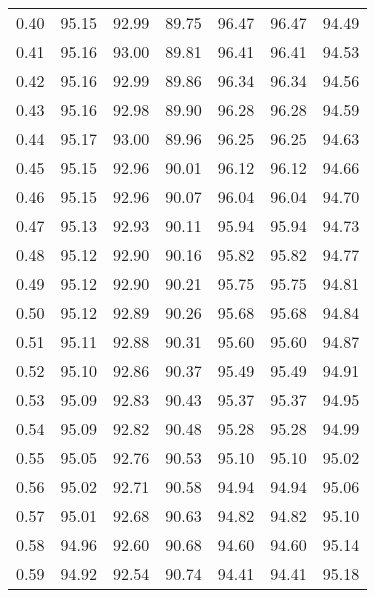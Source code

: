 \begin{tabular}{|c|c|c|c|c|c|c|}
      0.40 &     95.15 &     92.99 &      89.75 &   96.47 &      96.47 &         94.49 \\
      0.41 &     95.16 &     93.00 &      89.81 &   96.41 &      96.41 &         94.53 \\
      0.42 &     95.16 &     92.99 &      89.86 &   96.34 &      96.34 &         94.56 \\
      0.43 &     95.16 &     92.98 &      89.90 &   96.28 &      96.28 &         94.59 \\
      0.44 &     95.17 &     93.00 &      89.96 &   96.25 &      96.25 &         94.63 \\
      0.45 &     95.15 &     92.96 &      90.01 &   96.12 &      96.12 &         94.66 \\
      0.46 &     95.15 &     92.96 &      90.07 &   96.04 &      96.04 &         94.70 \\
      0.47 &     95.13 &     92.93 &      90.11 &   95.94 &      95.94 &         94.73 \\
      0.48 &     95.12 &     92.90 &      90.16 &   95.82 &      95.82 &         94.77 \\
      0.49 &     95.12 &     92.90 &      90.21 &   95.75 &      95.75 &         94.81 \\
      0.50 &     95.12 &     92.89 &      90.26 &   95.68 &      95.68 &         94.84 \\
      0.51 &     95.11 &     92.88 &      90.31 &   95.60 &      95.60 &         94.87 \\
      0.52 &     95.10 &     92.86 &      90.37 &   95.49 &      95.49 &         94.91 \\
      0.53 &     95.09 &     92.83 &      90.43 &   95.37 &      95.37 &         94.95 \\
      0.54 &     95.09 &     92.82 &      90.48 &   95.28 &      95.28 &         94.99 \\
      0.55 &     95.05 &     92.76 &      90.53 &   95.10 &      95.10 &         95.02 \\
      0.56 &     95.02 &     92.71 &      90.58 &   94.94 &      94.94 &         95.06 \\
      0.57 &     95.01 &     92.68 &      90.63 &   94.82 &      94.82 &         95.10 \\
      0.58 &     94.96 &     92.60 &      90.68 &   94.60 &      94.60 &         95.14 \\
      0.59 &     94.92 &     92.54 &      90.74 &   94.41 &      94.41 &         95.18 \\

\end{tabular}
